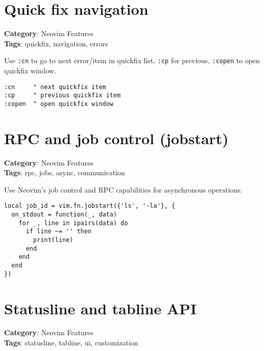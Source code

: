 {{{{{{{{{\section{Quick fix navigation}

\textbf{Category}: Neovim Features\\ \textbf{Tags}: quickfix, navigation, errors
\vspace{0.5cm}

Use {\footnotesize \Verb§:cn§} to go to next error/item in quickfix list, {\footnotesize \Verb§:cp§} for previous, {\footnotesize \Verb§:copen§} to open quickfix window.

\begin{Exa*}{}
\begin{Verbatim}[fontsize=\footnotesize, breaklines, breakanywhere]
:cn     " next quickfix item
:cp     " previous quickfix item
:copen  " open quickfix window
\end{Verbatim}
\end{Exa*}

\section{RPC and job control (jobstart)}

\textbf{Category}: Neovim Features\\ \textbf{Tags}: rpc, jobs, async, communication
\vspace{0.5cm}

Use Neovim's job control and RPC capabilities for asynchronous operations.

\begin{Exa*}{}
\begin{Verbatim}[fontsize=\footnotesize, breaklines, breakanywhere]
local job_id = vim.fn.jobstart({'ls', '-la'}, {
  on_stdout = function(_, data)
    for _, line in ipairs(data) do
      if line ~= '' then
        print(line)
      end
    end
  end
})
\end{Verbatim}
\end{Exa*}

\section{Statusline and tabline API}

\textbf{Category}: Neovim Features\\ \textbf{Tags}: statusline, tabline, ui, customization
\vspace{0.5cm}

}}}}}}}}}
